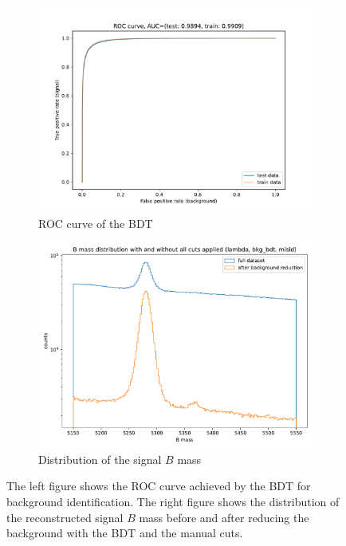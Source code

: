 \begin{figure}
    \centering
    \begin{subfigure}{0.5\textwidth}
        \centering
        \includegraphics[width=\textwidth]{images/BKG_BDT_ROC.pdf}
        \caption{ROC curve of the BDT}
        \label{fig:BKG_BDT_ROC}
    \end{subfigure}%
    \begin{subfigure}{0.5\textwidth}
        \centering
        \includegraphics[width=\textwidth]{images/BKG_reduced.pdf}
        \caption{Distribution of the signal $B$ mass}
        \label{fig:BKG_reduced}
    \end{subfigure}%
    \caption{The left figure shows the ROC curve achieved by the BDT for background identification. The right figure shows the distribution of the reconstructed signal $B$ mass before and after reducing the background with the BDT and the manual cuts.}
\end{figure}

